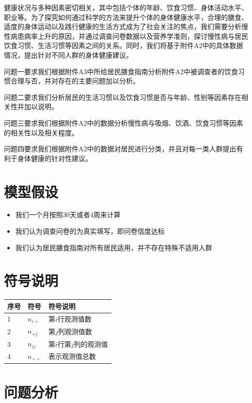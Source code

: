 \documentclass{cumcmthesis}
\begin{document}
健康状况与多种因素密切相关，其中包括个体的年龄、饮食习惯、身体活动水平、职业等。为了探究如何通过科学的方法来提升个体的身体健康水平，合理的膳食、适度的身体运动以及践行健康的生活方式成为了社会关注的焦点，我们需要分析慢性病患病率上升的原因，并通过调查问卷数据以及营养学准则，探讨慢性病与居民饮食习惯、生活习惯等因素之间的关系。同时，我们将基于附件A2中的具体数据情况，提出针对不同人群的身体健康建议。

问题一要求我们根据附件A3中所给居民膳食指南分析附件A2中被调查者的饮食习惯合理与否，并对存在的主要问题加以分析。

问题二要求我们分析居民的生活习惯以及饮食习惯是否与年龄、性别等因素存在相关性并加以说明。

问题三要求我们根据附件A2中的数据分析慢性病与吸烟、饮酒、饮食习惯等因素的相关性以及相关程度。

问题四要求我们根据附件A2中的数据对居民进行分类，并且对每一类人群提出有利于身体健康的针对性建议。
\section{模型假设}

\begin{itemize}
\item 我们一个月按照30天或者4周来计算
\item 我们认为调查问卷的为真实填写，即问卷信度达标
\item 我们认为居民膳食指南对所有居民适用，并不存在特殊不适用人群
\end{itemize}

\section{符号说明}
\begin{table}[H]
  \centering
  \begin{tabular}{p{60pt}<{\centering}|p{60pt}<{\centering}p{180pt}<{\raggedright}}
   \hline
    序号 & 符号 & 符号说明 \\
   \hline
    1 & $n_{i+}$&第$i$行观测值数\\
    2&$n_{+j}$&第$j$列观测值数\\
    3&$n_{ij}$&第$i$行第$j$列的观测值\\
    4&$n_{++}$&表示观测值总数 \\
    \hline
  \end{tabular}
  \label{symbol}
\end{table}
\section{问题分析}
\end{document}
